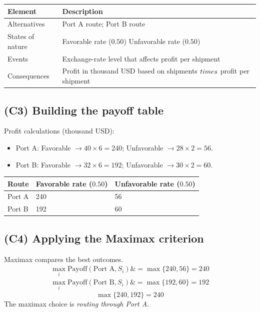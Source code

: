 \documentclass[11pt]{article}
\begin{document}
	\hypertarget{problem6-c2}{}
	
	\begin{center}
		\begin{tabular}{ll}
			\toprule
			Element & Description \\
			\midrule
			Alternatives & Port A route; Port B route \\
			States of nature & Favorable rate
			($0.50$)
			Unfavorable rate
			($0.50$) \\
			Events & Exchange-rate level that affects profit per shipment \\
			Consequences & Profit in thousand USD based on shipments $\\times$ profit per shipment \\
			\bottomrule
		\end{tabular}
	\end{center}
	
	\subsection*{(C3) Building the payoff table}
	
	\hypertarget{problem6-c3}{}
	
	Profit calculations (thousand USD):
	\begin{itemize}
		\item Port A: Favorable $\to 40 \times 6 = 240$; Unfavorable $\to 28 \times 2 = 56$.
		\item Port B: Favorable $\to 32 \times 6 = 192$; Unfavorable $\to 30 \times 2 = 60$.
	\end{itemize}
	\begin{center}
		\begin{tabular}{lll}
			\toprule
			Route & Favorable rate
			($0.50$) & Unfavorable rate
			($0.50$) \\
			\midrule
			Port A & 240 & 56 \\
			Port B & 192 & 60 \\
			\bottomrule
		\end{tabular}
	\end{center}
	
	\subsection*{(C4) Applying the Maximax criterion}
	
	\hypertarget{problem6-c4}{}
	
	Maximax compares the best outcomes.
	\[
	\begin{aligned}
		\max_i \text{Payoff}(\text{Port A}, S_i) \&= \max\{240, 56\} = 240 \\
		\max_i \text{Payoff}(\text{Port B}, S_i) \&= \max\{192, 60\} = 192
	\end{aligned}
	\]
	\[
	\max\{240, 192\} = 240
	\]
	The maximax choice is \emph{routing through Port A}.
	
\end{document}
